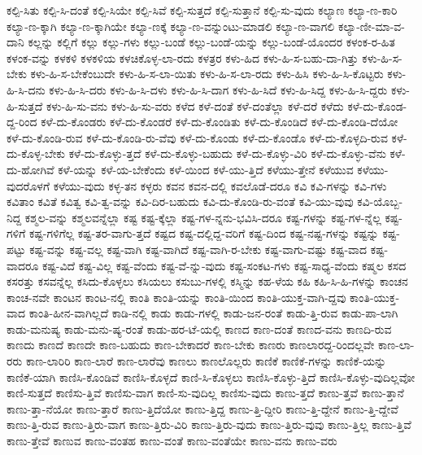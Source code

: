 {ಕಲ್ಪಿ-ಸಿತು
ಕಲ್ಪಿ-ಸಿ-ದಂತೆ
ಕಲ್ಪಿ-ಸಿಯೇ
ಕಲ್ಪಿ-ಸಿವೆ
ಕಲ್ಪಿ-ಸುತ್ತದೆ
ಕಲ್ಪಿ-ಸುತ್ತಾನೆ
ಕಲ್ಪಿ-ಸು-ವುದು
ಕಲ್ಯಾಣ
ಕಲ್ಯಾ-ಣ-ಕಾರಿ
ಕಲ್ಯಾ-ಣ-ಕ್ಕಾಗಿ
ಕಲ್ಯಾ-ಣ-ಕ್ಕಾಗಿಯೇ
ಕಲ್ಯಾ-ಣಕ್ಕೆ
ಕಲ್ಯಾ-ಣ-ವನ್ನುಂಟು-ಮಾಡಲಿ
ಕಲ್ಯಾ-ಣ-ವಾಗಲಿ
ಕಲ್ಯಾ-ಣೀ-ಮಾ-ವ-ದಾನಿ
ಕಲ್ಲನ್ನು
ಕಲ್ಲಿಗೆ
ಕಲ್ಲು
ಕಲ್ಲು-ಗಳು
ಕಲ್ಲು-ಬಂಡೆ
ಕಲ್ಲು-ಬಂಡೆ-ಯನ್ನು
ಕಲ್ಲು-ಬಂಡೆ-ಯೊಂದರ
ಕಳಂಕ-ರ-ಹಿತ
ಕಳಂಕ-ವನ್ನು
ಕಳಕಳಿ
ಕಳಕಳಿಯ
ಕಳಚಿಕೊಳ್ಳ-ಲಾ-ರದು
ಕಳತ್ರರ
ಕಳು-ಹಿದ
ಕಳು-ಹಿ-ಸ-ಬಹು-ದಾ-ಗಿತ್ತು
ಕಳು-ಹಿ-ಸ-ಬೇಕು
ಕಳು-ಹಿ-ಸ-ಬೇಕೆಂಬುದೇ
ಕಳು-ಹಿ-ಸ-ಲಾ-ಯಿತು
ಕಳು-ಹಿ-ಸ-ಲಾ-ರದು
ಕಳು-ಹಿಸಿ
ಕಳು-ಹಿ-ಸಿ-ಕೊಟ್ಟರು
ಕಳು-ಹಿ-ಸಿ-ದನು
ಕಳು-ಹಿ-ಸಿ-ದರು
ಕಳು-ಹಿ-ಸಿ-ದಳು
ಕಳು-ಹಿ-ಸಿ-ದಾಗ
ಕಳು-ಹಿ-ಸಿದೆ
ಕಳು-ಹಿ-ಸಿದ್ದ
ಕಳು-ಹಿ-ಸಿ-ದ್ದರು
ಕಳು-ಹಿ-ಸುತ್ತದೆ
ಕಳು-ಹಿ-ಸು-ವನು
ಕಳು-ಹಿ-ಸು-ವರು
ಕಳೆದ
ಕಳೆ-ದಂತೆ
ಕಳೆ-ದಂತೆಲ್ಲಾ
ಕಳೆ-ದರೆ
ಕಳೆದು
ಕಳೆ-ದು-ಕೊಂಡ-ದ್ದ-ರಿಂದ
ಕಳೆ-ದು-ಕೊಂಡರು
ಕಳೆ-ದು-ಕೊಂಡರೆ
ಕಳೆ-ದು-ಕೊಂಡಿತು
ಕಳೆ-ದು-ಕೊಂಡಿದೆ
ಕಳೆ-ದು-ಕೊಂಡಿ-ದೆಯೋ
ಕಳೆ-ದು-ಕೊಂಡಿ-ರುವ
ಕಳೆ-ದು-ಕೊಂಡಿ-ರು-ವೆವು
ಕಳೆ-ದು-ಕೊಂಡು
ಕಳೆ-ದು-ಕೊಂಡೊ
ಕಳೆ-ದು-ಕೊಳ್ಳದಿ-ರುವ
ಕಳೆ-ದು-ಕೊಳ್ಳ-ಬೇಕು
ಕಳೆ-ದು-ಕೊಳ್ಳು-ತ್ತದೆ
ಕಳೆ-ದು-ಕೊಳ್ಳು-ಬಹುದು
ಕಳೆ-ದು-ಕೊಳ್ಳು-ವಿರಿ
ಕಳೆ-ದು-ಕೊಳ್ಳು-ವೆನು
ಕಳೆ-ದು-ಹೋಗಿವೆ
ಕಳೆ-ಯನ್ನು
ಕಳೆ-ಯ-ಬೇಕೆಂದು
ಕಳೆ-ಯಿಂದ
ಕಳೆ-ಯು-ತ್ತಿದೆ
ಕಳೆಯು-ತ್ತೇನೆ
ಕಳೆಯುವ
ಕಳೆಯು-ವುದರೊಳಗೆ
ಕಳೆಯು-ವುದು
ಕಳ್ಳ-ತನ
ಕಳ್ಳರು
ಕವನ
ಕವನ-ದಲ್ಲಿ
ಕವಲೊಡೆ-ದರೂ
ಕವಿ
ಕವಿ-ಗಳನ್ನು
ಕವಿ-ಗಳು
ಕವಿತಾಂ
ಕವಿತೆ
ಕವಿತ್ವ
ಕವಿ-ತ್ವ-ವನ್ನು
ಕವಿ-ದಿರ-ಬಹುದು
ಕವಿ-ದು-ಕೊಂಡಿ-ರು-ವಂತೆ
ಕವಿ-ಯು-ವುವು
ಕವಿ-ಯೊಬ್ಬ-ನಿದ್ದ
ಕಶ್ಮಲ-ವನ್ನು
ಕಶ್ಮಲವನ್ನೆಲ್ಲಾ
ಕಷ್ಟ
ಕಷ್ಟ-ಕ್ಕೆಲ್ಲಾ
ಕಷ್ಟ-ಗಳ-ನ್ನನು-ಭವಿಸಿ-ದರೂ
ಕಷ್ಟ-ಗಳನ್ನು
ಕಷ್ಟ-ಗಳ-ನ್ನೆಲ್ಲ
ಕಷ್ಟ-ಗಳಿಗೆ
ಕಷ್ಟ-ಗಳಿಗೆಲ್ಲ
ಕಷ್ಟ-ತರ-ವಾಗು-ತ್ತದೆ
ಕಷ್ಟದ
ಕಷ್ಟ-ದಲ್ಲಿದ್ದ-ವರಿಗೆ
ಕಷ್ಟ-ದಿಂದ
ಕಷ್ಟ-ನಷ್ಟ-ಗಳನ್ನು
ಕಷ್ಟನ್ನು
ಕಷ್ಟ-ಪಟ್ಟು
ಕಷ್ಟ-ವನ್ನು
ಕಷ್ಟ-ವಲ್ಲ
ಕಷ್ಟ-ವಾಗಿ
ಕಷ್ಟ-ವಾಗಿದೆ
ಕಷ್ಟ-ವಾಗಿ-ರ-ಬೇಕು
ಕಷ್ಟ-ವಾಗು-ವಷ್ಟು
ಕಷ್ಟ-ವಾದ
ಕಷ್ಟ-ವಾದರೂ
ಕಷ್ಟ-ವಿದೆ
ಕಷ್ಟ-ವಿಲ್ಲ
ಕಷ್ಟ-ವೆಂದು
ಕಷ್ಟ-ವೆ-ನ್ನು-ವುದು
ಕಷ್ಟ-ಸಂಕಟ-ಗಳು
ಕಷ್ಟ-ಸಾಧ್ಯ-ವೆಂದು
ಕಷ್ಮಲ
ಕಸದ
ಕಸರತ್ತು
ಕಸವನ್ನೆಲ್ಲ
ಕಸಿದು-ಕೊಳ್ಳಲು
ಕಸಿಯಲು
ಕಸುಬು-ಗಳಲ್ಲಿ
ಕಸ್ಮಿನ್ನು
ಕಹ-ಳೆಯ
ಕಹಿ
ಕಹಿ-ಸಿ-ಹಿ-ಗಳನ್ನು
ಕಾಂಚನ
ಕಾಂಚ-ನವೇ
ಕಾಂಟನ
ಕಾಂಟ-ನಲ್ಲಿ
ಕಾಂತಿ
ಕಾಂತಿ-ಯನ್ನು
ಕಾಂತಿ-ಯಿಂದ
ಕಾಂತಿ-ಯುಕ್ತ-ವಾಗಿ-ದ್ದವು
ಕಾಂತಿ-ಯುಕ್ತ-ವಾದ
ಕಾಂತಿ-ಹೀನ-ವಾಗಿಲ್ಲದೆ
ಕಾಡಿ-ನಲ್ಲಿ
ಕಾಡು
ಕಾಡು-ಗಳಲ್ಲಿ
ಕಾಡು-ಜನ-ರಂತೆ
ಕಾಡು-ತ್ತಿ-ರುವ
ಕಾಡು-ಪಾ-ಲಾಗಿ
ಕಾಡು-ಮನುಷ್ಯ
ಕಾಡು-ಮನು-ಷ್ಯ-ರಂತೆ
ಕಾಡು-ಹರ-ಟೆ-ಯಲ್ಲಿ
ಕಾಣದ
ಕಾಣ-ದಂತೆ
ಕಾಣದ-ವನು
ಕಾಣದಿ-ರುವ
ಕಾಣದು
ಕಾಣದೆ
ಕಾಣದೇ
ಕಾಣ-ಬಹುದು
ಕಾಣ-ಬೇಕಾದರೆ
ಕಾಣ-ಬೇಕು
ಕಾಣರು
ಕಾಣಲಾರದ್ದ-ರಿಂದಲ್ಲವೇ
ಕಾಣ-ಲಾ-ರರು
ಕಾಣ-ಲಾರಿರಿ
ಕಾಣ-ಲಾರೆ
ಕಾಣ-ಲಾರೆವು
ಕಾಣಲು
ಕಾಣಲೊಲ್ಲರು
ಕಾಣಿಕೆ
ಕಾಣಿಕೆ-ಗಳನ್ನು
ಕಾಣಿಕೆ-ಯನ್ನು
ಕಾಣಿಕೆ-ಯಾಗಿ
ಕಾಣಿಸಿ-ಕೊಂಡಿವೆ
ಕಾಣಿಸಿ-ಕೊಳ್ಳದೆ
ಕಾಣಿ-ಸಿ-ಕೊಳ್ಳಲು
ಕಾಣಿಸಿ-ಕೊಳ್ಳು-ತ್ತಿದೆ
ಕಾಣಿಸಿ-ಕೊಳ್ಳು-ವುದಿಲ್ಲವೋ
ಕಾಣಿ-ಸುತ್ತದೆ
ಕಾಣಿಸು-ತ್ತಿವೆ
ಕಾಣಿಸು-ವಾಗ
ಕಾಣಿ-ಸು-ವುದಿಲ್ಲ
ಕಾಣಿಸು-ವುದು
ಕಾಣು-ತ್ತದೆ
ಕಾಣು-ತ್ತವೆ
ಕಾಣು-ತ್ತಾನೆ
ಕಾಣು-ತ್ತಾ-ನೆಯೋ
ಕಾಣು-ತ್ತಾರೆ
ಕಾಣು-ತ್ತಿದೆಯೋ
ಕಾಣು-ತ್ತಿದ್ದ
ಕಾಣು-ತ್ತಿ-ದ್ದೀರಿ
ಕಾಣು-ತ್ತಿ-ದ್ದೇನೆ
ಕಾಣು-ತ್ತಿ-ದ್ದೇವೆ
ಕಾಣು-ತ್ತಿ-ರುವ
ಕಾಣು-ತ್ತಿರು-ವಾಗ
ಕಾಣು-ತ್ತಿರು-ವಿರಿ
ಕಾಣು-ತ್ತಿರು-ವುದು
ಕಾಣು-ತ್ತಿರು-ವುವು
ಕಾಣು-ತ್ತಿಲ್ಲ
ಕಾಣು-ತ್ತಿವೆ
ಕಾಣು-ತ್ತೇವೆ
ಕಾಣುವ
ಕಾಣು-ವಂತಹ
ಕಾಣು-ವಂತೆ
ಕಾಣು-ವಂತೆಯೇ
ಕಾಣು-ವನು
ಕಾಣು-ವರು
}
